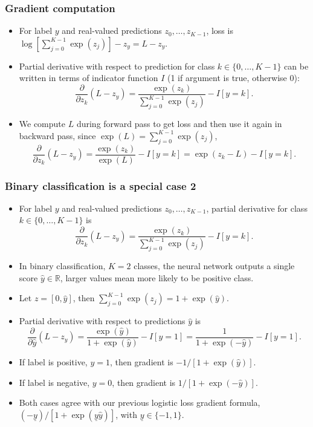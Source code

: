 \message{ !name(06-backprop.tex)}\documentclass{beamer}
\begin{document}
\begin{frame}
  \frametitle{Gradient computation}
  \begin{itemize}
  \item For label $y$ and real-valued predictions $z_0,\dots,z_{K-1}$, loss is
$
\log
\left[
\sum_{j=0}^{K-1}  \exp(z_j) 
\right]
-z_y= L-z_y.
$
\item Partial derivative with respect to prediction for class
  $k\in\{0,\dots,K-1\}$ can be written in terms of indicator function
  $I$ (1 if argument is true, otherwise 0):
$$
\frac{\partial}{\partial z_k}
\left(L-z_y\right) = 
\frac{\exp(z_k)}{\sum_{j=0}^{K-1}\exp(z_j)}
-I[y=k].
$$
\item We compute $L$ during forward pass to get loss and then use it
  again in backward pass, since $\exp(L)=\sum_{j=0}^{K-1}\exp(z_j)$,
$$
\frac{\partial}{\partial z_k}
\left(L-z_y\right) = 
\frac{\exp(z_k)}{\exp(L)}
-I[y=k]
=
\exp(z_k-L)
-I[y=k].
$$
\end{itemize}
\end{frame}

\begin{frame}
  \frametitle{Binary classification is a special case 2}
  \begin{itemize}
  \item For label $y$ and real-valued predictions $z_0,\dots,z_{K-1}$,
    partial derivative for class $k\in\{0,\dots,K-1\}$ is 
$$
\frac{\partial}{\partial z_k}
\left(L-z_y\right) = 
\frac{\exp(z_k)}{\sum_{j=0}^{K-1}\exp(z_j)}
-I[y=k].
$$
\item In binary classification, $K=2$ classes, the neural network
  outputs a single score $\hat y\in\mathbb R$, larger values mean more
  likely to be positive class.
\item Let $z=[0,\hat y]$, then $\sum_{j=0}^{K-1} \exp(z_j) = 1+\exp(\hat y)$.
\item Partial derivative with respect to predictions $\hat y$ is
$$
\frac{\partial}{\partial \hat y}
\left(L-z_y\right) 
= 
\frac{\exp(\hat y)}{1+\exp(\hat y)}
-I[y=1]
= 
\frac{1}{1+\exp(-\hat y)}
-I[y=1].
$$
\item If label is positive, $y=1$, then gradient is 
$-1/[1+\exp(\hat y)]$.
\item If label is negative, $y=0$, then gradient is
$1/[1+\exp(-\hat y)]$.
\item Both cases agree with our previous logistic loss gradient formula,
  $(-\underline y)/[1+\exp(\underline y \hat y)]$, with $\underline y\in\{-1,1\}$.
\end{itemize}
\end{frame}
\end{document}
